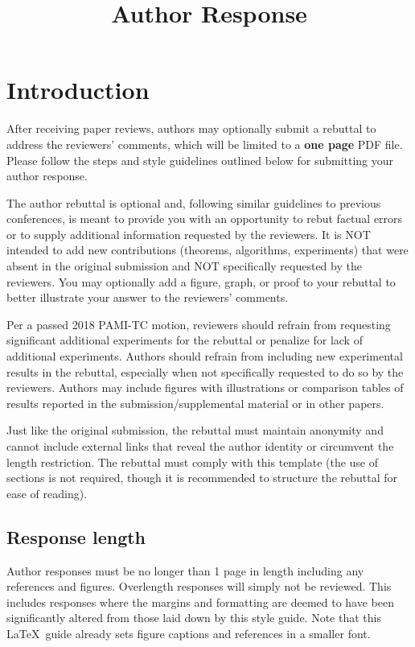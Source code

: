 \documentclass[10pt,twocolumn,letterpaper]{article}
\begin{document}
\title{Author Response}  %

\maketitle
\thispagestyle{empty}
\appendix

\section{Introduction}

After receiving paper reviews, authors may optionally submit a rebuttal to address the reviewers' comments, which will be limited to a {\bf one page} PDF file.
Please follow the steps and style guidelines outlined below for submitting your author response.

The author rebuttal is optional and, following similar guidelines to previous conferences, is meant to provide you with an opportunity to rebut factual errors or to supply additional information requested by the reviewers.
It is NOT intended to add new contributions (theorems, algorithms, experiments) that were absent in the original submission and NOT specifically requested by the reviewers.
You may optionally add a figure, graph, or proof to your rebuttal to better illustrate your answer to the reviewers' comments.

Per a passed 2018 PAMI-TC motion, reviewers should refrain from requesting significant additional experiments for the rebuttal or penalize for lack of additional experiments.
Authors should refrain from including new experimental results in the rebuttal, especially when not specifically requested to do so by the reviewers.
Authors may include figures with illustrations or comparison tables of results reported in the submission/supplemental material or in other papers.

Just like the original submission, the rebuttal must maintain anonymity and cannot include external links that reveal the author identity or circumvent the length restriction.
The rebuttal must comply with this template (the use of sections is not required, though it is recommended to structure the rebuttal for ease of reading).


\subsection{Response length}
Author responses must be no longer than 1 page in length including any references and figures.
Overlength responses will simply not be reviewed.
This includes responses where the margins and formatting are deemed to have been significantly altered from those laid down by this style guide.
Note that this \LaTeX\ guide already sets figure captions and references in a smaller font.
\end{document}

